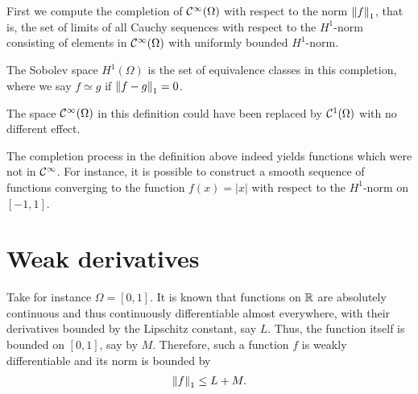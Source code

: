 \begin{definition}
  First we compute the completion of
  $\mathcal C^\infty(\Omega)$ with respect to the norm $\left\|f\right\|_1$, that is,
  the set of limits of all Cauchy sequences with respect to the
  $H^1$-norm consisting of elements in $\mathcal C^\infty(\Omega)$ with
  uniformly bounded $H^1$-norm.
  
  The Sobolev space $H^1(\Omega)$ is the set of equivalence classes in
  this completion, where we say $f\simeq g$ if $\left\|f-g\right\|_1=0$.
\end{definition}

\begin{note}
  The space $\mathcal C^\infty(\Omega)$ in this definition could have been
  replaced by $\mathcal C^1(\Omega)$ with no different effect.
\end{note}

\begin{example}
  The completion process in the definition above indeed yields
  functions which were not in $\mathcal C^\infty$. For instance, it is
  possible to construct a smooth sequence of functions converging to
  the function $f(x) = |x|$ with respect to the $H^1$-norm on $[-1,1]$.
\end{example}

\section{Weak derivatives}
\label{sec:weak-derivatives}

\begin{example}
   Take for instance $\Omega
  = [0,1]$. It is known that 
  functions on $\mathbb R$ are absolutely continuous and thus continuously
  differentiable almost everywhere, with their derivatives bounded by
  the Lipschitz constant, say $L$. Thus, the function itself is
  bounded on $[0,1]$, say by $M$. Therefore, such a function $f$ is
  weakly differentiable and its norm is bounded by
  \begin{gather*}
    \left\|f\right\|_1 \le L+M.
  \end{gather*}
\end{example}

